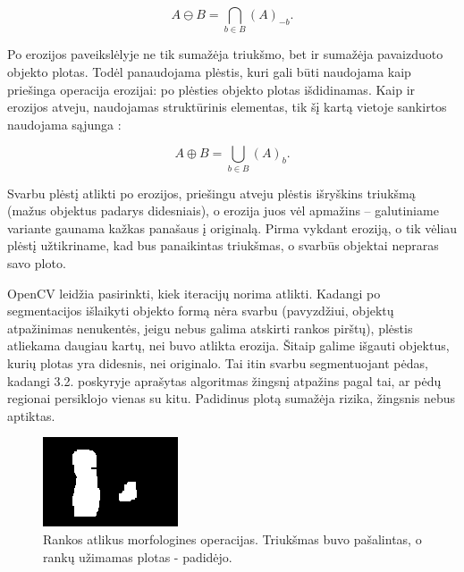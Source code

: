 \documentclass{VUMIFPSkursinis}
\begin{document}
\begin{equation}\label{eq:erozija}
A \ominus B = \bigcap_ {b \in B } (A)_{-b} .
\end{equation}

Po erozijos paveikslėlyje ne tik sumažėja triukšmo, bet ir sumažėja pavaizduoto objekto plotas. Todėl panaudojama plėstis, kuri gali būti naudojama kaip priešinga operacija erozijai: po plėsties objekto plotas išdidinamas. Kaip ir erozijos atveju, naudojamas struktūrinis elementas, tik šį kartą vietoje sankirtos naudojama sąjunga \cite{ImageAnalysisMorph}:

\begin{equation}\label{eq:plestis}
A \oplus B = \bigcup_ {b \in B } (A)_{b} .
\end{equation}

Svarbu plėstį atlikti po erozijos, priešingu atveju plėstis išryškins triukšmą (mažus objektus padarys didesniais), o erozija juos vėl apmažins – galutiniame variante gaunama kažkas panašaus į originalą. Pirma vykdant eroziją, o tik vėliau plėstį užtikriname, kad bus panaikintas triukšmas, o svarbūs objektai nepraras savo ploto. 

OpenCV leidžia pasirinkti, kiek iteracijų norima atlikti. Kadangi po segmentacijos išlaikyti objekto formą nėra svarbu (pavyzdžiui, objektų atpažinimas nenukentės, jeigu nebus galima atskirti rankos pirštų), plėstis atliekama daugiau kartų, nei buvo atlikta erozija. Šitaip galime išgauti objektus, kurių plotas yra didesnis, nei originalo. Tai itin svarbu segmentuojant pėdas, kadangi 3.2. poskyryje aprašytas algoritmas žingsnį atpažins pagal tai, ar pėdų regionai persiklojo vienas su kitu. Padidinus plotą sumažėja rizika, žingsnis nebus aptiktas.
\begin{figure}[H]
	\centering
	\includegraphics[scale=1]{imgs/morphrank}
	\caption{Rankos atlikus morfologines operacijas. Triukšmas buvo pašalintas, o rankų užimamas plotas - padidėjo.}
	\label{imgs:morphrank}
\end{figure}
\end{document}
